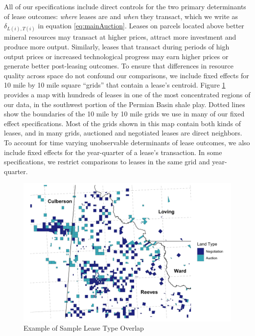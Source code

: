 \documentclass[12pt]{article}
\begin{document}
All of our specifications include direct controls for the two primary determinants of lease outcomes: \textit{where} leases are and \textit{when} they transact, which we write as $\delta_{L(i),T(i)}$ in equation \ref{eq:mainAuction}. Leases on parcels located above better mineral resources may transact at higher prices, attract more investment and produce more output. Similarly, leases that transact during periods of high output prices or increased technological progress may earn higher prices or generate better post-leasing outcomes. To ensure that differences in resource quality across space do not confound our comparisons, we include fixed effects for 10 mile by 10 mile square ``grids'' that contain a lease's centroid. Figure \ref{fig:RAL_overlap_map} provides a map with hundreds of leases in one of the most concentrated regions of our data, in the southwest portion of the Permian Basin shale play.  Dotted lines show the boundaries of the 10 mile by 10 mile grids we use in many of our fixed effect specifications. Most of the grids shown in this map contain both kinds of leases, and in many grids, auctioned and negotiated leases are direct neighbors. To account for time varying unobservable determinants of lease outcomes, we also include fixed effects for the year-quarter of a lease's transaction. In some specifications, we restrict comparisons to leases in the same grid and year-quarter. 

\begin{figure}[H]
	\begin{centering}
	\caption{Example of Sample Lease Type Overlap \label{fig:RAL_overlap_map}}
	\includegraphics[width=.9\textwidth]{../output/figures/sample_glo_leases.png}
	\par\end{centering}
\end{figure}
\end{document}
